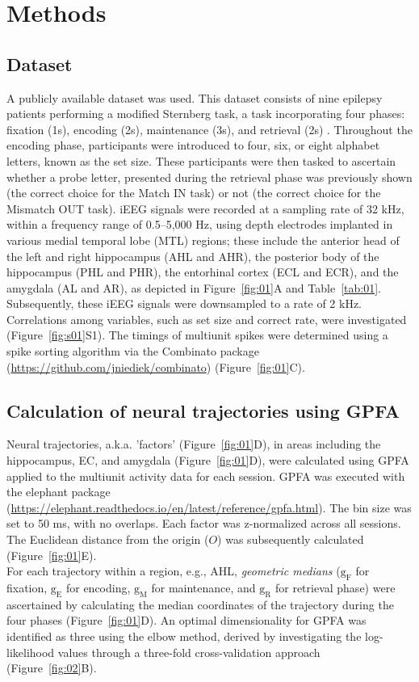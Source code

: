 \section{Methods}
\subsection{Dataset}
A publicly available dataset \cite{boran_dataset_2020} was used. This dataset consists of nine epilepsy patients performing a modified Sternberg task, a task incorporating four phases: fixation (1s), encoding (2s), maintenance (3s), and retrieval (2s) \cite{boran_dataset_2020}. Throughout the encoding phase, participants were introduced to four, six, or eight alphabet letters, known as the set size. These participants were then tasked to ascertain whether a probe letter, presented during the retrieval phase was previously shown (the correct choice for the Match IN task) or not (the correct choice for the Mismatch OUT task). iEEG signals were recorded at a sampling rate of 32 kHz, within a frequency range of 0.5--5,000 Hz, using depth electrodes implanted in various medial temporal lobe (MTL) regions; these include the anterior head of the left and right hippocampus (AHL and AHR), the posterior body of the hippocampus (PHL and PHR), the entorhinal cortex (ECL and ECR), and the amygdala (AL and AR), as depicted in Figure~\ref{fig:01}A and Table~\ref{tab:01}. Subsequently, these iEEG signals were downsampled to a rate of 2 kHz. Correlations among variables, such as set size and correct rate, were investigated (Figure~\ref{fig:s01}S1). The timings of multiunit spikes were determined using a spike sorting algorithm \cite{niediek_reliable_2016} via the Combinato package (\url{https://github.com/jniediek/combinato}) (Figure~\ref{fig:01}C).

\subsection{Calculation of neural trajectories using GPFA}
Neural trajectories, a.k.a. 'factors' (Figure~\ref{fig:01}D), in areas including the hippocampus, EC, and amygdala (Figure~\ref{fig:01}D), were calculated using GPFA \cite{yu_gaussian-process_2009} applied to the multiunit activity data for each session. GPFA was executed with the elephant package (\url{https://elephant.readthedocs.io/en/latest/reference/gpfa.html}). The bin size was set to 50 ms, with no overlaps. Each factor was z-normalized across all sessions. The Euclidean distance from the origin ($O$) was subsequently calculated (Figure~\ref{fig:01}E).
\\
\indent
For each trajectory within a region, e.g., AHL, \textit{geometric medians} ($\mathrm{g_{F}}$ for fixation, $\mathrm{g_{E}}$ for encoding, $\mathrm{g_{M}}$ for maintenance, and $\mathrm{g_{R}}$ for retrieval phase) were ascertained by calculating the median coordinates of the trajectory during the four phases (Figure~\ref{fig:01}D). An optimal dimensionality for GPFA was identified as three using the elbow method, derived by investigating the log-likelihood values through a three-fold cross-validation approach (Figure~\ref{fig:02}B).

